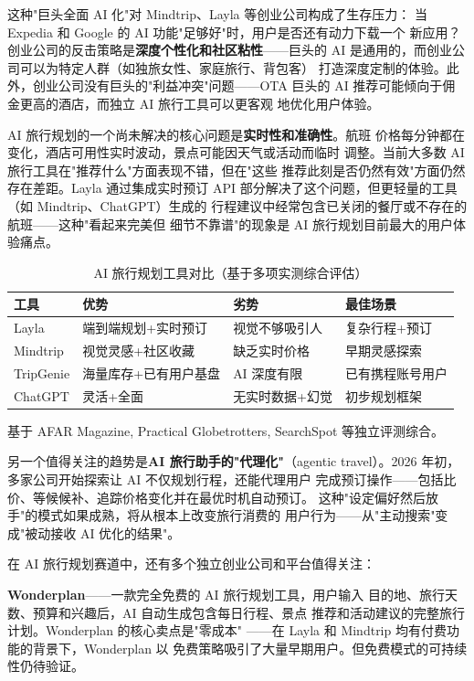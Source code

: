 这种"巨头全面 AI 化"对 Mindtrip、Layla 等创业公司构成了生存压力：
当 Expedia 和 Google 的 AI 功能"足够好"时，用户是否还有动力下载一个
新应用？创业公司的反击策略是\textbf{深度个性化和社区粘性}——巨头的 AI
是通用的，而创业公司可以为特定人群（如独旅女性、家庭旅行、背包客）
打造深度定制的体验。此外，创业公司没有巨头的"利益冲突"问题——OTA
巨头的 AI 推荐可能倾向于佣金更高的酒店，而独立 AI 旅行工具可以更客观
地优化用户体验。

AI 旅行规划的一个尚未解决的核心问题是\textbf{实时性和准确性}。航班
价格每分钟都在变化，酒店可用性实时波动，景点可能因天气或活动而临时
调整。当前大多数 AI 旅行工具在"推荐什么"方面表现不错，但在"这些
推荐此刻是否仍然有效"方面仍然存在差距。Layla 通过集成实时预订 API
部分解决了这个问题，但更轻量的工具（如 Mindtrip、ChatGPT）生成的
行程建议中经常包含已关闭的餐厅或不存在的航班——这种"看起来完美但
细节不靠谱"的现象是 AI 旅行规划目前最大的用户体验痛点。

\begin{table}[htbp]
\centering
\caption{AI 旅行规划工具对比（基于多项实测综合评估）}
\label{tab:travel-comparison}
\small
\begin{tabularx}{\textwidth}{l X X X}
\toprule
\rowcolor{figLightGray}
\textbf{工具} & \textbf{优势} & \textbf{劣势} & \textbf{最佳场景} \\
\midrule
Layla        & 端到端规划+实时预订    & 视觉不够吸引人    & 复杂行程+预订 \\
Mindtrip     & 视觉灵感+社区收藏      & 缺乏实时价格      & 早期灵感探索 \\
TripGenie    & 海量库存+已有用户基盘  & AI 深度有限        & 已有携程账号用户 \\
ChatGPT      & 灵活+全面              & 无实时数据+幻觉    & 初步规划框架 \\
\bottomrule
\end{tabularx}

\medskip
\noindent \small 基于 AFAR Magazine, Practical Globetrotters, SearchSpot
等独立评测综合。
\end{table}

另一个值得关注的趋势是\textbf{AI 旅行助手的"代理化"}（agentic
travel）。2026 年初，多家公司开始探索让 AI 不仅规划行程，还能代理用户
完成预订操作——包括比价、等候候补、追踪价格变化并在最优时机自动预订。
这种"设定偏好然后放手"的模式如果成熟，将从根本上改变旅行消费的
用户行为——从"主动搜索"变成"被动接收 AI 优化的结果"。

在 AI 旅行规划赛道中，还有多个独立创业公司和平台值得关注：

\textbf{Wonderplan}——一款完全免费的 AI 旅行规划工具，用户输入
目的地、旅行天数、预算和兴趣后，AI 自动生成包含每日行程、景点
推荐和活动建议的完整旅行计划。Wonderplan 的核心卖点是"零成本"
——在 Layla 和 Mindtrip 均有付费功能的背景下，Wonderplan 以
免费策略吸引了大量早期用户。但免费模式的可持续性仍待验证。

